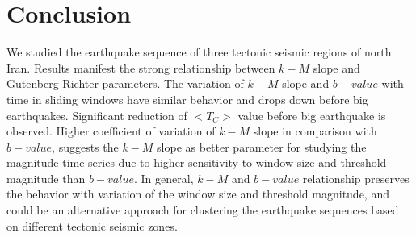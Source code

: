 
\section{Conclusion}
\noindent
We studied the earthquake sequence of three tectonic seismic regions of north Iran. Results manifest the strong relationship between $k-M$ slope and Gutenberg-Richter parameters. The variation of $k-M$ slope and $b-value$ with time in sliding windows have similar behavior and drops down before big earthquakes. Significant reduction of $<T_C>$ value before big earthquake is observed. Higher coefficient of variation of $k-M$ slope in comparison with $b-value$, suggests the $k-M$ slope as better parameter for studying the magnitude time series due to higher sensitivity to window size and threshold magnitude than $b-value$. In general, $k-M$ and $b-value$ relationship preserves the behavior with variation of the window size and threshold magnitude, and could be an alternative approach for clustering the earthquake sequences based on different tectonic seismic zones.
